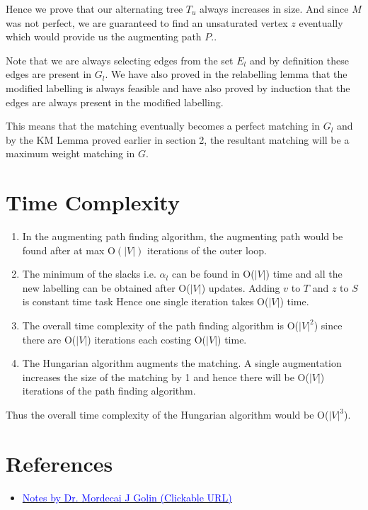 \documentclass{article}
\begin{document}
Hence we prove that our alternating tree $T_u$ always increases in size. And since $M$ was not perfect, we are guaranteed to find an unsaturated vertex $z$ eventually which would provide us the augmenting path $P$..

Note that we are always selecting edges from the set $E_l$ and by definition these edges are present in $G_l$. We have also proved in the relabelling lemma that the modified labelling is always feasible and have also proved by induction that the edges are always present in the modified labelling. 

This means that the matching eventually becomes a perfect matching in $G_l$ and by the KM Lemma proved earlier in section 2, the resultant matching will be a maximum weight matching in $G$.

\section{Time Complexity}
\begin{enumerate}
    \item In the augmenting path finding algorithm, the augmenting path would be found after at max O$(|V|)$ iterations of the outer loop.
    \item The minimum of the slacks i.e. $\alpha_l$ can be found in O($|V|$) time and all the new labelling can be obtained after O($|V|$) updates. Adding $v$ to $T$ and $z$ to $S$ is constant time task Hence one single iteration takes O($|V|$) time.
    \item The overall time complexity of the path finding algorithm is O($|V|^2$) since there are O($|V|$) iterations each costing O($|V|$) time.
    \item The Hungarian algorithm augments the matching. A single augmentation increases the size of the matching by 1 and hence there will be O($|V|$) iterations of the path finding algorithm.
\end{enumerate}
Thus the overall time complexity of the Hungarian algorithm would be O($|V|^3$).

\section{References}

\begin{itemize}
    \item \href{http://www.cse.ust.hk/~golin/COMP572/Notes/Matching.pdf}{\textcolor{blue}{Notes by Dr. Mordecai J Golin (Clickable URL)}}
\end{itemize}
\end{document}
